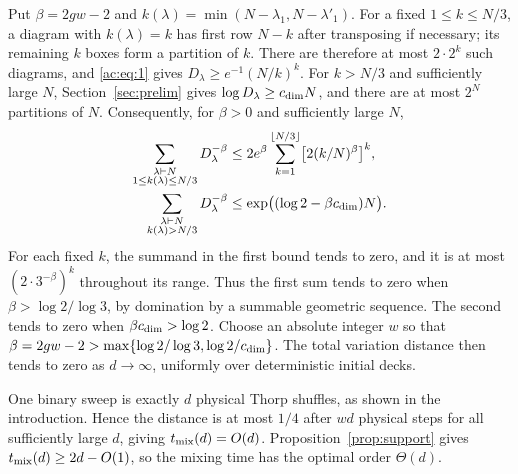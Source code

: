 Put \(\beta=2gw-2\) and
\(k(\lambda)=\min(N-\lambda_1,N-\lambda'_1)\). For a fixed \(1\le k\le N/3\), a diagram with \(k(\lambda)=k\) has first row \(N-k\) after transposing if necessary; its remaining \(k\) boxes form a partition of \(k\). There are therefore at most \(2\cdot2^k\) such diagrams, and \eqref{ac:eq:1} gives \(D_\lambda\ge e^{-1}(N/k)^k\). For \(k>N/3\) and sufficiently large \(N\), Section~\ref{sec:prelim} gives \(\log D_\lambda\ge c_{\rm dim}N\), and there are at most \(2^N\) partitions of \(N\). Consequently, for \(\beta>0\) and sufficiently large \(N\),
\[
\begin{aligned}
 \sum_{\substack{\lambda\vdash N\\1\le k(\lambda)\le N/3}}D_\lambda^{-\beta}
 &\le 2e^\beta\sum_{k=1}^{\lfloor N/3\rfloor}
                  \bigl[2(k/N)^\beta\bigr]^k,\\
 \sum_{\substack{\lambda\vdash N\\k(\lambda)>N/3}}D_\lambda^{-\beta}
 &\le \exp\bigl((\log2-\beta c_{\rm dim})N\bigr).
\end{aligned}
\]
For each fixed \(k\), the summand in the first bound tends to zero, and it is at most \((2\cdot3^{-\beta})^k\) throughout its range. Thus the first sum tends to zero when \(\beta>\log2/\log3\), by domination by a summable geometric sequence. The second tends to zero when \(\beta c_{\rm dim}>\log2\). Choose an absolute integer \(w\) so that
\(\beta=2gw-2>\max\{\log2/\log3,\log2/c_{\rm dim}\}\).
The total variation distance then tends to zero as \(d\to\infty\), uniformly over deterministic initial decks.

One binary sweep is exactly \(d\) physical Thorp shuffles, as shown in the introduction. Hence the distance is at most \(1/4\) after \(wd\) physical steps for all sufficiently large \(d\), giving \(t_{\rm mix}(d)=O(d)\). Proposition~\ref{prop:support} gives \(t_{\rm mix}(d)\ge2d-O(1)\), so the mixing time has the optimal order \(\Theta(d)\).
